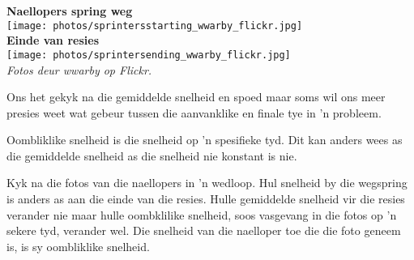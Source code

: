 \begin{minipage}{.5\textwidth}
\begin{center}
\textbf{Naellopers spring weg}\\
\texttt{[image: photos/sprintersstarting\_wwarby\_flickr.jpg]}\\
\textbf{Einde van resies}\\
\texttt{[image: photos/sprintersending\_wwarby\_flickr.jpg]}\\
\textit{Fotos deur wwarby op Flickr.}
\end{center}
\end{minipage}
\begin{minipage}{.5\textwidth}

Ons het gekyk na die gemiddelde snelheid en spoed maar soms wil ons meer presies weet wat gebeur tussen die aanvanklike en finale tye in 'n probleem.

Oombliklike snelheid is die snelheid op 'n spesifieke tyd. Dit kan anders wees as die gemiddelde snelheid as die snelheid nie konstant is nie.

Kyk na die fotos van die naellopers in 'n wedloop. Hul snelheid by die wegspring is anders as aan die einde van die resies. Hulle gemiddelde snelheid vir die resies verander nie maar hulle oombklilike snelheid, soos vasgevang in die fotos op 'n sekere tyd, verander wel. Die snelheid van die naelloper toe die die foto geneem is, is sy oombliklike snelheid.

\end{minipage}

\\




